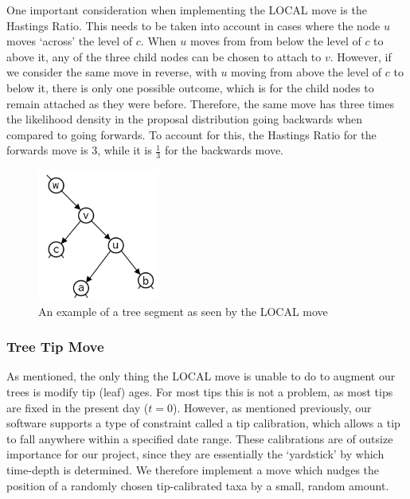 \documentclass[10pt,journal,compsoc]{IEEEtran}
\begin{document}
One important consideration when implementing the LOCAL move is the Hastings Ratio. This needs to be taken into account in cases where the node $u$ moves `across' the level of $c$. When $u$ moves from from below the level of $c$ to above it, any of the three child nodes can be chosen to attach to $v$. However, if we consider the same move in reverse, with $u$ moving from above the level of $c$ to below it, there is only one possible outcome, which is for the child nodes to remain attached as they were before. Therefore, the same move has three times the likelihood density in the proposal distribution going backwards when compared to going forwards. To account for this, the Hastings Ratio for the forwards move is $3$, while it is $\frac{1}{3}$ for the backwards move. 
\begin{figure}
\caption{An example of a tree segment as seen by the LOCAL move}\label{fig:local}
\vspace{0.2cm}
\includegraphics[width=4cm,center]{local}
\end{figure}

\subsubsection{Tree Tip Move}
As mentioned, the only thing the LOCAL move is unable to do to augment our trees is modify tip (leaf) ages. For most tips this is not a problem, as most tips are fixed in the present day ($t = 0$). However, as mentioned previously, our software supports a type of constraint called a tip calibration, which allows a tip to fall anywhere within a specified date range. These calibrations are of outsize importance for our project, since they are essentially the `yardstick' by which time-depth is determined. We therefore implement a move which nudges the position of a randomly chosen tip-calibrated taxa by a small, random amount.
\end{document}
